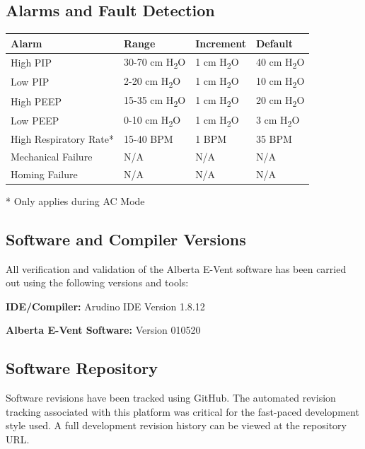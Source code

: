 \documentclass[]{article}
\begin{document}
\subsection{Alarms and Fault Detection}
\begin{center}
	\begin{tabular}{ |p{3.8cm}| p{2.2cm}| p{2.2cm}|p{2.2cm}|}
		\hline
		\textbf{Alarm} & \textbf{Range} & \textbf{Increment} & \textbf{Default}\\
		\hline
		High PIP & 30-70 cm H\textsubscript{2}O & 1 cm H\textsubscript{2}O & 40 cm H\textsubscript{2}O\\
		\hline
		Low PIP & 2-20 cm H\textsubscript{2}O & 1 cm H\textsubscript{2}O & 10 cm H\textsubscript{2}O\\
		\hline
		High PEEP & 15-35 cm H\textsubscript{2}O & 1 cm H\textsubscript{2}O &  20 cm H\textsubscript{2}O\\
		\hline
		Low PEEP & 0-10 cm H\textsubscript{2}O & 1 cm H\textsubscript{2}O &  3 cm H\textsubscript{2}O\\
		\hline
		High Respiratory Rate* & 15-40 BPM & 1 BPM & 35 BPM\\
		\hline
		Mechanical Failure & N/A & N/A & N/A\\
		\hline
		Homing Failure & N/A & N/A & N/A \\
		\hline
	\end{tabular}
	
\end{center}
* Only applies during AC Mode


\subsection{Software and Compiler Versions}

All verification and validation of the Alberta E-Vent software has been carried out using the following versions and tools:
\bigskip

\noindent\textbf{IDE/Compiler:} Arudino IDE Version 1.8.12

\noindent\textbf{Alberta E-Vent Software:} Version 010520

\subsection{Software Repository}

Software revisions have been tracked using GitHub.  The automated revision tracking associated with this platform was critical for the fast-paced development style used.  A full development revision history can be viewed at the repository URL.
\bigskip
\end{document}
